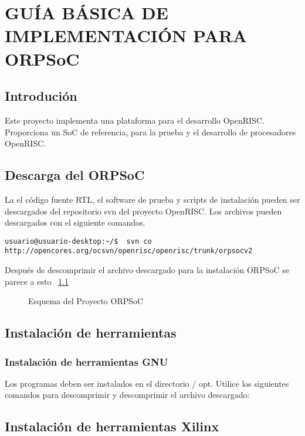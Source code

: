 \chapter{GUÍA BÁSICA  DE IMPLEMENTACIÓN PARA ORPSoC}

 \section{Introdución}
Este proyecto implementa una plataforma para el desarrollo OpenRISC. Proporciona un SoC de referencia, para la prueba y el desarrollo de procesadores OpenRISC.

 \section{Descarga del ORPSoC}
La el código fuente RTL, el software de prueba y scripts de instalación pueden ser descargados del repositorio svn del proyecto OpenRISC. Los archivos pueden descargados con el siguiente comandos.

\begin{lstlisting}[breaklines]
 usuario@usuario-desktop:~/$  svn co http://opencores.org/ocsvn/openrisc/openrisc/trunk/orpsocv2
\end{lstlisting}

Después de descomprimir el archivo descargado para la instalación ORPSoC se parece a esto ~\ref{fig:esquema} 

\begin{figure}[h!]
 \begin{center}
  \caption{Esquema del Proyecto ORPSoC }
  \label{fig:esquema}
 \end{center}
\end{figure}

 \section{Instalación de herramientas}
 \subsection{Instalación de herramientas GNU}

Los programas deben ser instalados en el directorio / opt. Utilice los siguientes comandos para descomprimir y descomprimir el archivo descargado: 


 \section{Instalación de herramientas Xilinx}


